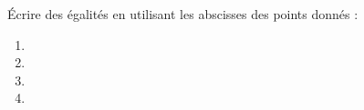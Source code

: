 
\begin{exercice}\label{exo2smath-0213}

    Écrire des égalités en utilisant les abscisses des points donnés :
    \begin{enumerate}
        \item
   
\item
   
\item
   
   \item
   
    \end{enumerate}

\end{exercice}
